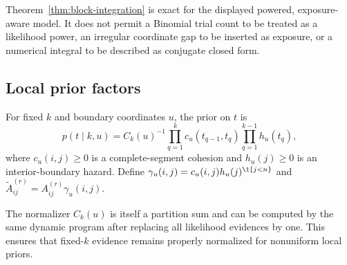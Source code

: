 \begin{remark}
Theorem~\ref{thm:block-integration} is exact for the displayed powered, exposure-aware model. It does not permit a Binomial trial count to be treated as a likelihood power, an irregular coordinate gap to be inserted as exposure, or a numerical integral to be described as conjugate closed form.
\end{remark}

\subsection{Local prior factors}
\begin{assumption}
\label{ass:factorized-prior}
For fixed $k$ and boundary coordinates $u$, the prior on $t$ is
\begin{equation}
 p(t\mid k,u)=C_k(u)^{-1}
 \prod_{q=1}^{k}c_u(t_{q-1},t_q)
 \prod_{q=1}^{k-1}h_u(t_q),
\label{eq:partition-prior}
\end{equation}
where $c_u(i,j)\ge0$ is a complete-segment cohesion and $h_u(j)\ge0$ is an interior-boundary hazard. Define
$\gamma_u(i,j)=c_u(i,j)h_u(j)^{\1\{j<n\}}$ and
$\widetilde A^{(r)}_{ij}=A^{(r)}_{ij}\gamma_u(i,j)$.
\end{assumption}
The normalizer $C_k(u)$ is itself a partition sum and can be computed by the same dynamic program after replacing all likelihood evidences by one. This ensures that fixed-$k$ evidence remains properly normalized for nonuniform local priors.

